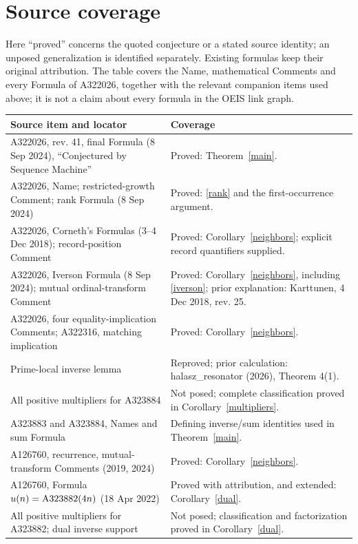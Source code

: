 \documentclass[11pt]{article}
\newcommand{\A}[1]{\textnormal{A#1}}
\begin{document}
\section{Source coverage}
Here ``proved'' concerns the quoted conjecture or a stated source identity;
an unposed generalization is identified separately. Existing formulas keep
their original attribution. The table covers the Name, mathematical
Comments and every Formula of A322026, together with the relevant companion
items used above; it is not a claim about every formula in the OEIS link graph.
\small
\begin{longtable}{@{}>{\raggedright\arraybackslash}p{.46\linewidth}>{\raggedright\arraybackslash}p{.49\linewidth}@{}}
\toprule Source item and locator & Coverage \\
\midrule\endhead
A322026, rev. 41, final Formula (8 Sep 2024), ``Conjectured by Sequence Machine'' & Proved: Theorem~\ref{main}. \\
A322026, Name; restricted-growth Comment; rank Formula (8 Sep 2024) & Proved: \eqref{rank} and the first-occurrence argument. \\
A322026, Corneth's Formulas (3--4 Dec 2018); record-position Comment & Proved: Corollary~\ref{neighbors}; explicit record quantifiers supplied. \\
A322026, Iverson Formula (8 Sep 2024); mutual ordinal-transform Comment & Proved: Corollary~\ref{neighbors}, including \eqref{iverson}; prior explanation: Karttunen, 4 Dec 2018, rev. 25. \\
A322026, four equality-implication Comments; A322316, matching implication & Proved: Corollary~\ref{neighbors}. \\
Prime-local inverse lemma & Reproved; prior calculation: halasz\_resonator (2026), Theorem 4(1). \\
All positive multipliers for A323884 & Not posed; complete classification proved in Corollary~\ref{multipliers}. \\
A323883 and A323884, Names and sum Formula & Defining inverse/sum identities used in Theorem~\ref{main}. \\
A126760, recurrence, mutual-transform Comments (2019, 2024) & Proved: Corollary~\ref{neighbors}. \\
A126760, Formula $u(n)=\A{323882}(4n)$ (18 Apr 2022) & Proved with attribution, and extended: Corollary~\ref{dual}. \\
All positive multipliers for A323882; dual inverse support & Not posed; classification and factorization proved in Corollary~\ref{dual}. \\

\end{longtable}
\end{document}
